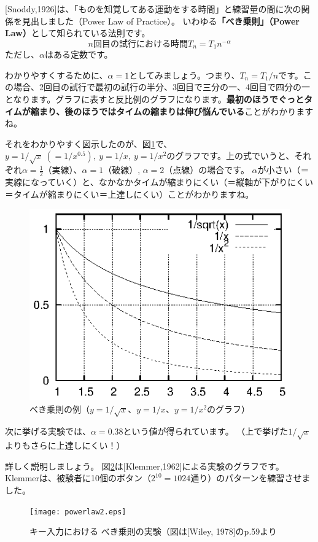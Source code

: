 [Snoddy,1926]は、「ものを知覚してある運動をする時間」と練習量の間に次の関係を見出しました（Power Law of Practice）。
いわゆる{\bf 「べき乗則」（Power Law）}として知られている法則です。
\[
  n回目の試行における時間 T_n = T_1n^{-\alpha}
\]
ただし、$\alpha$はある定数です。

わかりやすくするために、$\alpha=1$としてみましょう。つまり、$T_n = T_1/n$です。この場合、2回目の試行で最初の試行の半分、3回目で三分の一、4回目で四分の一となります。グラフに表すと反比例のグラフになります。{\bf 最初のほうでぐっとタイムが縮まり、後のほうではタイムの縮まりは伸び悩んでいる}ことがわかりますね。

それをわかりやすく図示したのが、図\ref{fig:powerlaw}で、$y=1/\sqrt{x}\ (=1/x^{0.5}),\  y=1/x,\  y=1/x^2$のグラフです。上の式でいうと、それぞれ$\alpha = \frac{1}{2}$（実線）、$\alpha = 1$（破線）, $\alpha = 2$（点線）の場合です。
$\alpha$が小さい（＝実線になっていく）と、なかなかタイムが縮まりにくい（＝縦軸が下がりにくい＝タイムが縮まりにくい＝上達しにくい）ことがわかりますね。

\begin{figure}[htbp]
 \begin{center}
  \includegraphics[width=0.7\hsize]{graph.eps}
 \end{center}
 \caption{べき乗則の例（$y=1/\sqrt{x}$、$y=1/x$、$y=1/x^2$のグラフ）}
 \label{fig:powerlaw}
\end{figure}

次に挙げる実験では、$\alpha = 0.38$という値が得られています。
（上で挙げた$1/\sqrt{x}$よりもさらに上達しにくい！）

詳しく説明しましょう。
図\ref{fig:powerlaw2}は[Klemmer,1962]による実験のグラフです。
Klemmerは、被験者に10個のボタン（$2^{10} =1024$通り）のパターンを練習させました。

\begin{figure}[htbp]
 \begin{center}
  \texttt{[image: powerlaw2.eps]}
 \end{center}
 \caption{キー入力における べき乗則の実験（図は[Wiley, 1978]のp.59より}
 \label{fig:powerlaw2}
\end{figure}

